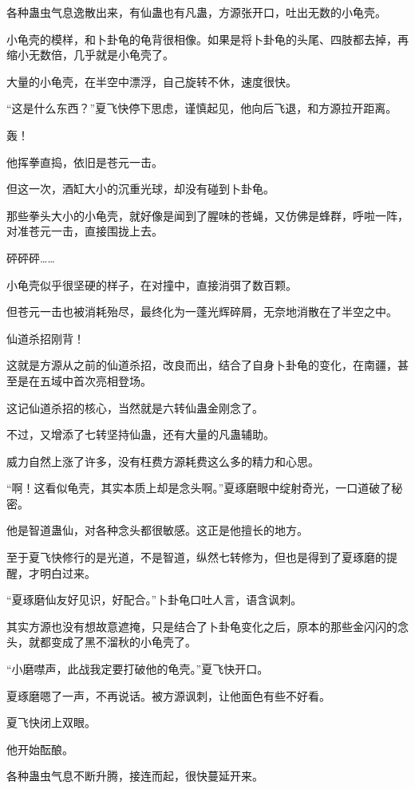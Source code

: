 \begin{this_body}
各种蛊虫气息逸散出来，有仙蛊也有凡蛊，方源张开口，吐出无数的小龟壳。

小龟壳的模样，和卜卦龟的龟背很相像。如果是将卜卦龟的头尾、四肢都去掉，再缩小无数倍，几乎就是小龟壳了。

大量的小龟壳，在半空中漂浮，自己旋转不休，速度很快。

“这是什么东西？”夏飞快停下思虑，谨慎起见，他向后飞退，和方源拉开距离。

轰！

他挥拳直捣，依旧是苍元一击。

但这一次，酒缸大小的沉重光球，却没有碰到卜卦龟。

那些拳头大小的小龟壳，就好像是闻到了腥味的苍蝇，又仿佛是蜂群，呼啦一阵，对准苍元一击，直接围拢上去。

砰砰砰……

小龟壳似乎很坚硬的样子，在对撞中，直接消弭了数百颗。

但苍元一击也被消耗殆尽，最终化为一蓬光辉碎屑，无奈地消散在了半空之中。

仙道杀招刚背！

这就是方源从之前的仙道杀招，改良而出，结合了自身卜卦龟的变化，在南疆，甚至是在五域中首次亮相登场。

这记仙道杀招的核心，当然就是六转仙蛊金刚念了。

不过，又增添了七转坚持仙蛊，还有大量的凡蛊辅助。

威力自然上涨了许多，没有枉费方源耗费这么多的精力和心思。

“啊！这看似龟壳，其实本质上却是念头啊。”夏琢磨眼中绽射奇光，一口道破了秘密。

他是智道蛊仙，对各种念头都很敏感。这正是他擅长的地方。

至于夏飞快修行的是光道，不是智道，纵然七转修为，但也是得到了夏琢磨的提醒，才明白过来。

“夏琢磨仙友好见识，好配合。”卜卦龟口吐人言，语含讽刺。

其实方源也没有想故意遮掩，只是结合了卜卦龟变化之后，原本的那些金闪闪的念头，就都变成了黑不溜秋的小龟壳了。

“小磨噤声，此战我定要打破他的龟壳。”夏飞快开口。

夏琢磨嗯了一声，不再说话。被方源讽刺，让他面色有些不好看。

夏飞快闭上双眼。

他开始酝酿。

各种蛊虫气息不断升腾，接连而起，很快蔓延开来。


\end{this_body}

